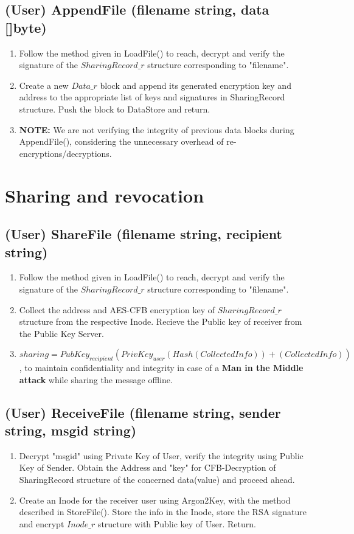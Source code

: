 \documentclass[a4paper, 12pt]{scrartcl}
\begin{document}
\subsection{(User) AppendFile (filename string, data []byte)}
\begin{enumerate}
	\itemsep0em
	\item Follow the method given in LoadFile() to reach, decrypt and verify the signature of the $SharingRecord\_r$ structure corresponding to "filename". 
	\item Create a new $Data\_r$ block and append its generated encryption key and address to the appropriate list of keys and signatures in SharingRecord structure. Push the block to DataStore and return.
	\item \textbf{NOTE:} We are not verifying the integrity of previous data blocks during AppendFile(), considering the unnecessary overhead of re-encryptions/decryptions.
\end{enumerate}

\section{Sharing and revocation}

\subsection{(User) ShareFile (filename string, recipient string)}
\begin{enumerate}
	\itemsep0em
	\item Follow the method given in LoadFile() to reach, decrypt and verify the signature of the $SharingRecord\_r$ structure corresponding to "filename".
	\item Collect the address and AES-CFB encryption key of $SharingRecord\_r$ structure from the respective Inode. Recieve the Public key of receiver from the Public Key Server.
	\item $sharing = PubKey_{recipient}(PrivKey_{user}(Hash(Collected Info)) + (Collected Info))$, to maintain confidentiality and integrity in case of a \textbf{Man in the Middle attack} while sharing the message offline.
\end{enumerate}

\subsection{(User) ReceiveFile (filename string, sender string, msgid string)}
\begin{enumerate}
	\itemsep0em
	\item Decrypt "msgid" using Private Key of User, verify the integrity using Public Key of Sender. Obtain the Address and "key" for CFB-Decryption of SharingRecord structure of the concerned data(value) and proceed ahead.
	\item Create an Inode for the receiver user using Argon2Key, with the method described in StoreFile(). Store the info in the Inode, store the RSA signature and encrypt $Inode\_r$ structure with Public key of User. Return.
\end{enumerate}
\end{document}
